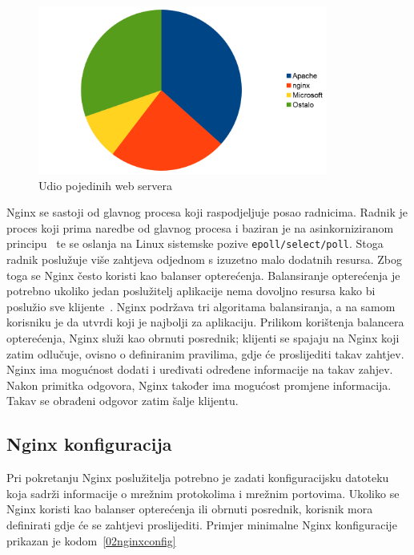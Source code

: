 \begin{figure}[h]
    \centering
    \includegraphics[width=0.85\textwidth]{img/02/nginx_ratio.png}
    \caption{Udio pojedinih web servera}%
    \label{fig:02nginx_ratio}
\end{figure}

Nginx se sastoji od glavnog procesa koji raspodjeljuje posao radnicima. Radnik je proces koji prima
naredbe od glavnog procesa i baziran je na asinkorniziranom principu~\citep{reese2008nginx} te se
oslanja na Linux sistemske pozive \texttt{epoll/select/poll}. Stoga radnik poslužuje više zahtjeva
odjednom s izuzetno malo dodatnih resursa. Zbog toga se Nginx često koristi kao balanser
opterećenja. Balansiranje opterećenja je potrebno ukoliko jedan poslužitelj aplikacije nema
dovoljno resursa kako bi poslužio sve klijente~\citep{soni2016load}. Nginx podržava tri algoritama
balansiranja, a na samom korisniku je da utvrdi koji je najbolji za aplikaciju. Prilikom korištenja
balancera opterećenja, Nginx služi kao obrnuti posrednik; klijenti se spajaju na Nginx koji zatim
odlučuje, ovisno o definiranim pravilima, gdje će proslijediti takav zahtjev. Nginx ima mogućnost
dodati i uređivati određene informacije na takav zahjev. Nakon primitka odgovora, Nginx također ima
mogućost promjene informacija. Takav se obrađeni odgovor zatim šalje klijentu.

\subsection{Nginx konfiguracija}
Pri pokretanju Nginx poslužitelja potrebno je zadati konfiguracijsku datoteku koja sadrži
informacije o mrežnim protokolima i mrežnim portovima. Ukoliko se Nginx koristi kao balanser
opterećenja ili obrnuti posrednik, korisnik mora definirati gdje će se zahtjevi proslijediti.
Primjer minimalne Nginx konfiguracije prikazan je kodom~\ref{02nginxconfig}

